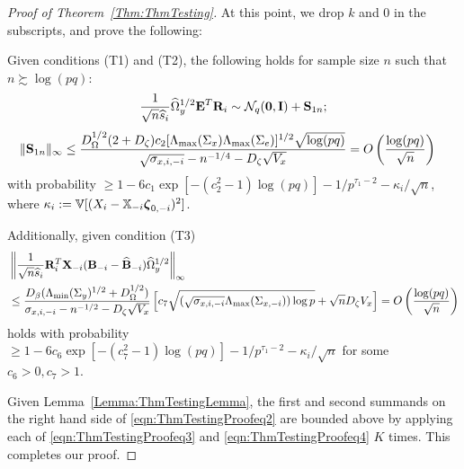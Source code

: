 \begin{proof}[Proof of Theorem~\ref{Thm:ThmTesting}]
At this point, we drop $k$ and 0 in the subscripts, and prove the following:

\begin{Lemma}\label{Lemma:ThmTestingLemma}
Given conditions (T1) and (T2), the following holds for sample size $n$ such that $n \succsim \log (pq)$:
%
$$
\frac{1}{\sqrt n \widehat s_i}  \widehat \Omega_y^{1/2} {\mathbf{E}}^T {\mathbf{R}}_i \sim
{\cal{N}}_q ({\bf 0}, {\mathbf{I}}) + {\mathbf{S}}_{1n};
$$
%
\begin{align}\label{eqn:ThmTestingProofeq3}
\| {\mathbf{S}}_{1n} \|_\infty & \leq 
\frac{D_\Omega^{1/2} (2 + D_\zeta) c_2 [ \Lambda_{\max} (\Sigma_x) \Lambda_{\max} (\Sigma_e) ]^{1/2} \sqrt{ \log(pq)}}{\sqrt{ \sigma_{x,i,-i}} - n^{-1/4} - D_\zeta \sqrt{V_x}} =
O \left( \frac{ \log(pq)}{\sqrt n} \right)
\end{align}
%
with probability $\geq 1 - 6c_1 \exp[-(c_2^2-1) \log (p q)] - 1/p^{\tau_1-2} - \kappa_i/\sqrt n$, where $\kappa_i := {\mathbb{V}} [(X_i - {\mathbb{X}}_{-i} {\boldsymbol{\zeta}}_{0,-i})^2]$.

Additionally, given condition (T3)
%
\begin{align}\label{eqn:ThmTestingProofeq4}
& \left\| \frac{1}{\sqrt n \widehat s_i} {\mathbf{R}}_i^T {\mathbf{X}}_{-i} ({\mathbf{B}}_{-i} - \widehat {{\mathbf{B}}}_{-i})
\widehat \Omega_y^{1/2} \right\|_\infty \notag\\
& \leq
\frac{D_\beta ( \Lambda_{\min} (\Sigma_y)^{1/2} + D_\Omega^{1/2})}{\sigma_{x,i,-i} - n^{-1/2} - D_\zeta \sqrt{V_x}} 
\left[ c_{7} \sqrt{ (\sqrt{ \sigma_{x,i,-i}} \Lambda_{\max} (\Sigma_{x, -i}) ) \log p} + \sqrt n D_\zeta V_x \right] =
O \left( \frac{ \log(pq)}{\sqrt n} \right)
\end{align}
%
holds with probability $\geq 1 - 6c_6 \exp[-(c_7^2-1) \log (p q)] - 1/p^{\tau_1-2} - \kappa_i/\sqrt n$ for some $c_6 > 0, c_7 > 1$.
\end{Lemma}

Given Lemma~\ref{Lemma:ThmTestingLemma}, the first and second summands on the right hand side of \eqref{eqn:ThmTestingProofeq2} are bounded above by applying each of \eqref{eqn:ThmTestingProofeq3} and \eqref{eqn:ThmTestingProofeq4} $K$ times. This completes our proof.
\end{proof}

